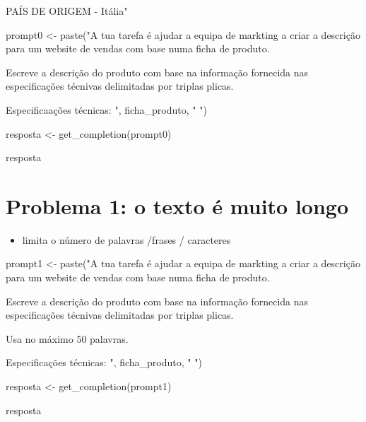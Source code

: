 \documentclass[
  letterpaper,
  paper=6in:9in,
  pagesize=pdftex,
  headinclude=on,
  footinclude=on,
  12pt]{scrbook}
\newenvironment{Shaded}{\begin{snugshade}}{\end{snugshade}}
\newcommand{\FunctionTok}[1]{\textcolor[rgb]{0.28,0.35,0.67}{#1}}
\newcommand{\NormalTok}[1]{\textcolor[rgb]{0.00,0.23,0.31}{#1}}
\newcommand{\OtherTok}[1]{\textcolor[rgb]{0.00,0.23,0.31}{#1}}
\newcommand{\StringTok}[1]{\textcolor[rgb]{0.13,0.47,0.30}{#1}}
\providecommand{\tightlist}{%
  \setlength{\itemsep}{0pt}\setlength{\parskip}{0pt}}\usepackage{longtable,booktabs,array}
\begin{document}
\begin{Shaded}
\begin{Highlighting}[]
\StringTok{PAÍS DE ORIGEM}
\StringTok{{-} Itália"}

\NormalTok{prompt0 }\OtherTok{\textless{}{-}} \FunctionTok{paste}\NormalTok{(}\StringTok{"A tua tarefa é ajudar a equipa de markting a criar a descrição }
\StringTok{para um website de vendas com base numa ficha de produto.}

\StringTok{Escreve a descrição do produto com base na informação fornecida }
\StringTok{nas especificações técnivas delimitadas por triplas plicas.}

\StringTok{Especificaações técnicas: \textquotesingle{}\textquotesingle{}\textquotesingle{} "}\NormalTok{, ficha\_produto, }\StringTok{"\textquotesingle{}\textquotesingle{}\textquotesingle{} "}\NormalTok{)}

\NormalTok{resposta }\OtherTok{\textless{}{-}} \FunctionTok{get\_completion}\NormalTok{(prompt0)}

\NormalTok{resposta}
\end{Highlighting}
\end{Shaded}

\hypertarget{problema-1-o-texto-uxe9-muito-longo}{%
\section{Problema 1: o texto é muito
longo}\label{problema-1-o-texto-uxe9-muito-longo}}

\begin{itemize}
\tightlist
\item
  limita o número de palavras /frases / caracteres
\end{itemize}

\begin{Shaded}
\begin{Highlighting}[]
\NormalTok{prompt1 }\OtherTok{\textless{}{-}} \FunctionTok{paste}\NormalTok{(}\StringTok{"A tua tarefa é ajudar a equipa de markting a criar a descrição }
\StringTok{para um website de vendas com base numa ficha de produto.}

\StringTok{Escreve a descrição do produto com base na informação fornecida }
\StringTok{nas especificações técnivas delimitadas por triplas plicas.}

\StringTok{Usa no máximo 50 palavras.}

\StringTok{Especificações técnicas: \textquotesingle{}\textquotesingle{}\textquotesingle{} "}\NormalTok{, ficha\_produto, }\StringTok{"\textquotesingle{}\textquotesingle{}\textquotesingle{} "}\NormalTok{)}

\NormalTok{resposta }\OtherTok{\textless{}{-}} \FunctionTok{get\_completion}\NormalTok{(prompt1)}

\NormalTok{resposta}
\end{Highlighting}
\end{Shaded}
\end{document}
